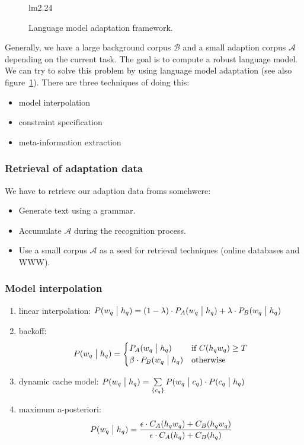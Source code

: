 \documentclass[11pt]{article}
\begin{document}
\begin{figure}[htb]
    \begin{minipage}{\linewidth}
        \vspace{6cm}
        \hfill \scriptsize lm2.24
    \end{minipage}
    \caption{\label{fig:lmAdaptationFramework} Language model adaptation framework.}
\end{figure}

Generally, we have a large background corpus $\mathcal{B}$ and a small adaption corpus $\mathcal{A}$ depending on the current task. The goal is to compute a robust language model. We can try to solve this problem by using language model adaptation (see also figure~\ref{fig:lmAdaptationFramework}). There are three techniques of doing this:
\begin{itemize}
    \item model interpolation
    \item constraint specification
    \item meta-information extraction
\end{itemize}

\subsubsection{Retrieval of adaptation data}
We have to retrieve our adaption data froms somehwere:
\begin{itemize}
    \item Generate text using a grammar.
    \item Accumulate $\mathcal{A}$ during the recognition process.
    \item Use a small corpus $\mathcal{A}$ as a seed for retrieval techniques (online databases and WWW).
\end{itemize}

\subsubsection{Model interpolation}
\begin{enumerate}
    \item linear interpolation: $P(w_q \bigm| h_q) = (1 - \lambda) \cdot P_A(w_q \bigm| h_q) + \lambda \cdot P_B(w_q \bigm| h_q)$
    \item backoff:
        \[
            P(w_q \bigm| h_q) = \begin{cases}
                P_A(w_q \bigm| h_q) & \mbox{if } C(h_q w_q) \geq T \\
                \beta \cdot P_B(w_q \bigm| h_q) & \mbox{otherwise}
            \end{cases}
        \]
    \item dynamic cache model: $P(w_q \bigm| h_q) = \sum\limits_{\left\{c_q\right\}} P(w_q \bigm| c_q) \cdot P(c_q \bigm| h_q)$
    \item maximum a-posteriori:
        \[
            P(w_q \bigm| h_q) = \frac{\epsilon \cdot C_A(h_qw_q) + C_B(h_qw_q)}{\epsilon \cdot C_A(h_q) + C_B(h_q)}
        \]
\end{enumerate}
\end{document}
